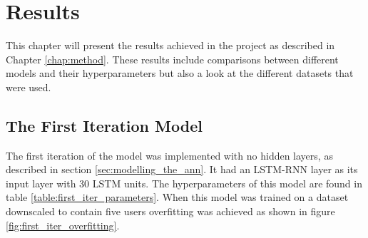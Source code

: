 \chapter{Results}\label{chap:results}
This chapter will present the results achieved in the project as described in Chapter \ref{chap:method}. These results include comparisons between different models and their hyperparameters but also a look at the different datasets that were used.

\section{The First Iteration Model}
The first iteration of the model was implemented with no hidden layers, as described in section \ref{sec:modelling_the_ann}. It had an LSTM-RNN layer as its input layer with 30 LSTM units. The hyperparameters of this model are found in table \ref{table:first_iter_parameters}. When this model was trained on a dataset downscaled to contain five users overfitting was achieved as shown in figure \ref{fig:first_iter_overfitting}.
